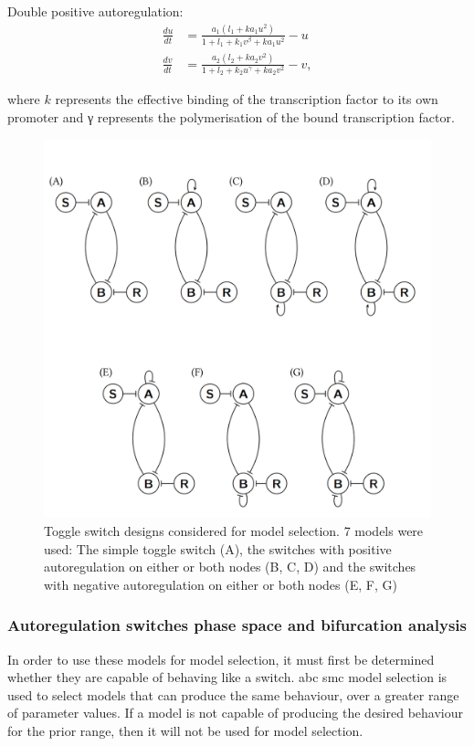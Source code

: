 Double positive autoregulation: 
\begin{align}\label{eq:gards_pos}
\frac{du}{dt} &= \frac{a_1  (l_1 + ka_{1}  u^{2}) }{1+l_1 + k_1  v^{\beta} + ka_{1}  u^{2}} - u \\
\frac{dv}{dt} &= \frac{a_2  (l_2 + ka_{2}  v^{2}) }{1+l_2 + k_2  u^{\gamma} + ka_{2}  v^{2}} - v,
\end{align}

\noindent where $k$ represents the effective binding of the transcription factor to its own promoter and γ represents the polymerisation of the bound transcription factor. 


\begin{figure}[tb]
	\begin{center}
\includegraphics[width=\textwidth]{../../chapters/chapterABCSysBio/images/toggle_switch_designs.png}
\caption[Model designs considered for model selection.]{\label{fig:toggle_switch_designs}Toggle switch designs considered for model selection. 7 models were used: The simple toggle switch (A), the switches with positive autoregulation on either or both nodes (B, C, D) and the switches with negative autoregulation on either or both nodes (E, F, G)}
\end{center}
\end{figure}
\clearpage

\subsubsection{Autoregulation switches phase space and bifurcation analysis}
\label{sec:models_bist_bif}
In order to use these models for model selection, it must first be determined whether they are capable of behaving like a switch. \acrshort{abc} \acrshort{smc} model selection is used to select models that can produce the same behaviour, over a greater range of parameter values. If a model is not capable of producing the desired behaviour for the prior range, then it will not be used for model selection.

